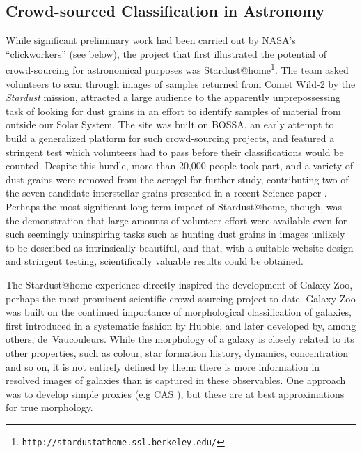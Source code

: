 \documentclass{ar2e}
\def\CaseStudy#1{\noindent{\it\bf #1 \,\,\,\,}}
\def\url#1{\texttt{#1}}
\begin{document}
\subsection{Crowd-sourced Classification in Astronomy}
\label{sec:class:astro}

\CaseStudy{Stardust@home}
While significant preliminary work had been carried out by NASA's
``clickworkers'' (see below), the project that first illustrated the potential
of crowd-sourcing for astronomical purposes was 
Stardust@home\footnote{\url{http://stardustathome.ssl.berkeley.edu/}}. The team
asked volunteers to scan through images of samples returned from Comet Wild-2 by
the \textit{Stardust} mission, attracted a large audience to the apparently
unprepossessing task of looking for dust grains in an effort to identify samples
of material from outside our Solar System. The site was built on BOSSA, an early
attempt to build a generalized platform for such crowd-sourcing projects, and
featured a stringent test which volunteers had to pass before their
classifications would be counted. Despite this hurdle, more than 20,000 people
took part, and a variety of dust grains were removed from the aerogel for
further study, contributing two of the seven candidate interstellar grains
presented in a recent Science paper \citep{Westphal}. Perhaps the most
significant long-term impact of Stardust@home, though, was the demonstration
that large amounts of volunteer effort were available even for such seemingly
uninspiring tasks such as hunting dust grains in images unlikely to be described
as intrinsically beautiful, and that, with a suitable website design and
stringent testing, scientifically valuable results could be obtained. 



\CaseStudy{Galaxy morphology with Galaxy Zoo}  

The Stardust@home experience directly inspired the development of Galaxy Zoo,
perhaps the most prominent scientific crowd-sourcing project to date. Galaxy Zoo
was built on the continued importance of morphological classification of
galaxies, first introduced in a systematic fashion by Hubble, and later
developed by, among others, de~Vaucouleurs.  While the morphology of a galaxy is
closely related to its other properties, such as colour, star formation history,
dynamics, concentration and so on, it is not entirely defined by them: there is
more information in resolved images of galaxies than is captured in these
observables.  One approach was to develop simple proxies (e.g CAS \citep{Conselice}), but these
are at best approximations for true morphology. 
\end{document}
